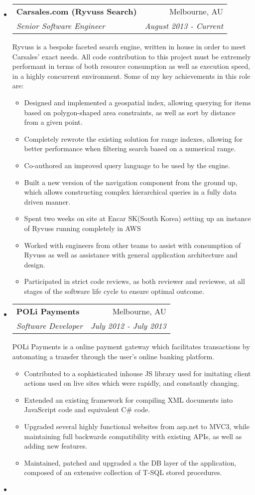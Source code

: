 \documentclass[letterpaper,11pt]{article}
\makeatletter
\newlength{\outerbordwidth}
\newcommand{\resitem}[1]{\item #1 \vspace{-2pt}}
\newcommand{\resheading}[1]{\vspace{-7pt}
  \parbox{\textwidth}{\setlength{\FrameSep}{\outerbordwidth}
    \begin{shaded}
\setlength{\fboxsep}{0pt}\framebox[\textwidth][l]{\setlength{\fboxsep}{4pt}\fcolorbox{shadecolorB}{shadecolorB}{\textbf{\sffamily{\mbox{~}\makebox[6.762in][l]{\large #1} \vphantom{p\^{E}}}}}}
    \end{shaded}
  }\vspace{-5pt}
}
\newcommand{\ressubheading}[4]{
\begin{tabular*}{6.5in}{l@{\cftdotfill{\cftsecdotsep}\extracolsep{\fill}}r}
		\textbf{#1} & #2 \\
		\textit{#3} & \textit{#4} \\
\end{tabular*}\vspace{-6pt}}
\makeatother
\begin{document}
\resheading{Employment History}
\begin{itemize}
\item
	\ressubheading{Carsales.com (Ryvuss Search)}{Melbourne, AU}{Senior Software Engineer}{August 2013 - Current}
	
	Ryvuss is a bespoke faceted search engine, written in house in order to meet Carsales' exact needs. All code contribution to this project must be extremely performant in terms of both resource consumption as well as execution speed, in a highly concurrent environment. Some of my key achievements in this role are:
	\vspace{-3mm}
	\begin{itemize}
		\resitem{Designed and implemented a geospatial index, allowing querying for items based on polygon-shaped area constraints, as well as sort by distance from a given point.}
		\resitem{Completely rewrote the existing solution for range indexes, allowing for better performance when filtering search based on a numerical range.}
		\resitem{Co-authored an improved query language to be used by the engine.}
		\resitem{Built a new version of the navigation component from the ground up, which allows constructing complex hierarchical queries in a fully data driven manner.}
		\resitem{Spent two weeks on site at Encar SK(South Korea) setting up an instance of Ryvuss running completely in AWS}
		\resitem{Worked with engineers from other teams to assist with consumption of Ryvuss as well as assistance with general application architecture and design.}
		\resitem{Participated in strict code reviews, as both reviewer and reviewee, at all stages of the software life cycle to ensure optimal outcome.}
	\end{itemize}
\item
	\ressubheading{POLi Payments}{Melbourne, AU}{Software Developer}{July 2012 - July 2013}
	
	POLi Payments is a online payment gateway which facilitates transactions by automating a transfer through the user's online banking platform. 
	\vspace{-3mm}
	\begin{itemize}
		\resitem{Contributed to a sophisticated inhouse JS library used for imitating client actions used on live sites which were rapidly, and constantly changing.}
		\resitem{Extended an existing framework for compiling XML documents into JavaScript code and equivalent C\# code.}
		\resitem{Upgraded several highly functional websites from asp.net to MVC3, while maintaining full backwards compatibility with existing APIs, as well as adding new features.} 
		\resitem{Maintained, patched and upgraded a the DB layer of the application, composed of an extensive collection of T-SQL stored procedures.}
	\end{itemize}
\item


\end{itemize}
\end{document}
